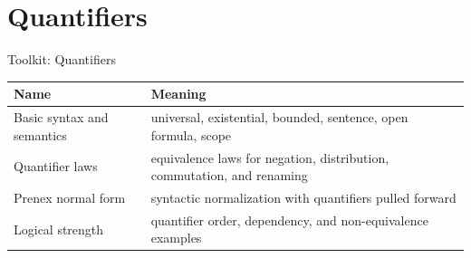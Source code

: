 
\section{Quantifiers}

\begin{toolkitbox}{Toolkit: Quantifiers}
\small
\begin{tabular}{l l}
\toprule
\textbf{Name} & \textbf{Meaning} \\
\midrule
Basic syntax and semantics & universal, existential, bounded, sentence, open formula, scope \\
Quantifier laws & equivalence laws for negation, distribution, commutation, and renaming \\
Prenex normal form & syntactic normalization with quantifiers pulled forward \\
Logical strength & quantifier order, dependency, and non-equivalence examples \\
\bottomrule
\end{tabular}
\end{toolkitbox}







